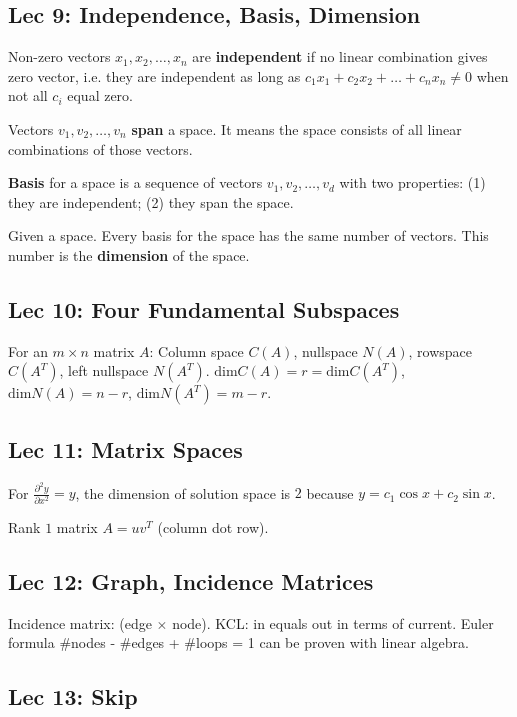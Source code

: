 \subsection{Lec 9: Independence, Basis, Dimension}

Non-zero vectors $x_1,x_2,\ldots,x_n$ are {\bf independent} if no linear combination
gives zero vector, i.e. they are independent as long as
$c_1x_1+c_2x_2+\ldots+c_nx_n\ne 0$ when not all $c_i$ equal zero.

Vectors $v_1,v_2,\ldots,v_n$ {\bf span} a space. It means the space consists of
all linear combinations of those vectors.

{\bf Basis} for a space is a sequence of vectors $v_1,v_2,\ldots,v_d$ with two
properties: (1) they are independent; (2) they span the space.

Given a space. Every basis for the space has the same number of vectors. This
number is the {\bf dimension} of the space.

\subsection{Lec 10: Four Fundamental Subspaces}

For an $m\times n$ matrix $A$:
Column space $C(A)$, nullspace $N(A)$, rowspace $C(A^T)$, left nullspace $N(A^T)$.
$\text{dim} C(A)=r=\text{dim} C(A^T)$, $\text{dim} N(A)=n-r$, $\text{dim} N(A^T)=m-r$.

\subsection{Lec 11: Matrix Spaces}

For $\frac{\partial^2 y}{\partial x^2} = y$, the dimension of solution space
is $2$ because $y=c_1 \cos x + c_2 \sin x$.

Rank $1$ matrix $A=uv^T$ (column dot row).

\subsection{Lec 12: Graph, Incidence Matrices}

Incidence matrix: (edge $\times$ node). KCL: in equals out in terms of current.
Euler formula #nodes - #edges + #loops = 1 can be proven with linear algebra.

\subsection{Lec 13: Skip}

